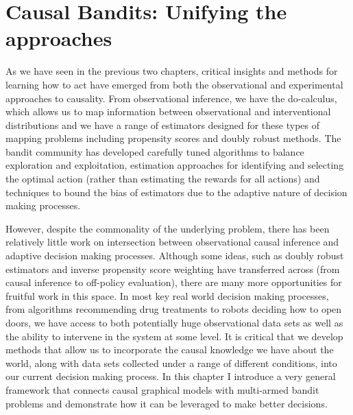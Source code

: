 \documentclass[11pt,a4paper,oneside]{book}
\theoremstyle{plain}
\theoremstyle{definition}
\begin{document}
\chapter{Causal Bandits: Unifying the approaches}
\label{chap:causal-bandit}

As we have seen in the previous two chapters, critical insights and methods for learning how to act have emerged from both the observational and experimental approaches to causality. From observational inference, we have the do-calculus, which allows us to map information between observational and interventional distributions and we have a range of estimators designed for these types of mapping problems including propensity scores and doubly robust methods. The bandit community has developed carefully tuned algorithms to balance exploration and exploitation, estimation approaches for identifying and selecting the optimal action (rather than estimating the rewards for all actions) and techniques to bound the bias of estimators due to the adaptive nature of decision making processes.

However, despite the commonality of the underlying problem, there has been relatively little work on intersection between observational causal inference and adaptive decision making processes. Although some ideas, such as doubly robust estimators and inverse propensity score weighting have transferred across (from causal inference to off-policy evaluation), there are many more opportunities for fruitful work in this space. In most key real world decision making processes, from algorithms recommending drug treatments to robots deciding how to open doors, we have access to both potentially huge observational data sets as well as the ability to intervene in the system at some level. It is critical that we develop methods that allow us to incorporate the causal knowledge we have about the world, along with data sets collected under a range of different conditions, into our current decision making process. In this chapter I introduce a very general framework that connects causal graphical models with multi-armed bandit problems and demonstrate how it can be leveraged to make better decisions.
\end{document}
